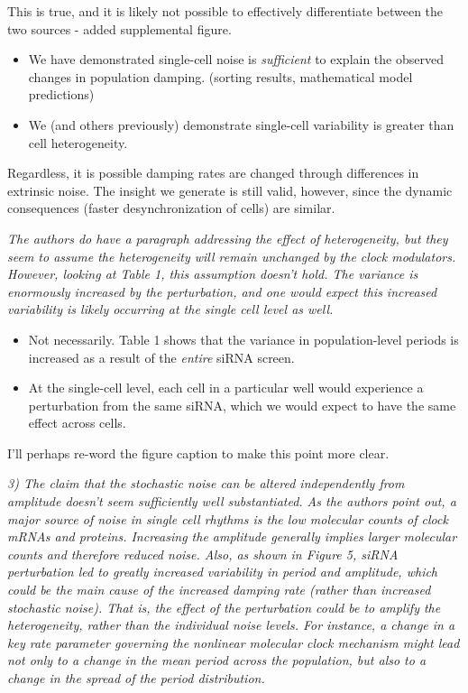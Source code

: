 \documentclass[11pt, letterpaper]{article}
\newenvironment{reviewer}{\itshape\color{gray}}{}
\begin{document}
This is true, and it is likely not possible to effectively differentiate between the two sources - added supplemental figure.
\begin{itemize}
  \item We have demonstrated single-cell noise is {\itshape sufficient} to explain the observed changes in population damping. (sorting results, mathematical model predictions)
  \item We (and others previously) demonstrate single-cell variability is greater than cell heterogeneity.
\end{itemize}
Regardless, it is possible damping rates are changed through differences in extrinsic noise. The insight we generate is still valid, however, since the dynamic consequences (faster desynchronization of cells) are similar.

\begin{reviewer}
The authors do have a paragraph addressing the effect of heterogeneity, but they seem to assume the heterogeneity will remain unchanged by the clock modulators. However, looking at Table 1, this assumption doesn't hold. The variance is enormously increased by the perturbation, and one would expect this increased variability is likely occurring at the single cell level as well.
\end{reviewer}

\begin{itemize}
  \item Not necessarily. Table 1 shows that the variance in population-level periods is increased as a result of the {\itshape entire} siRNA screen.
  \item At the single-cell level, each cell in a particular well would experience a perturbation from the same siRNA, which we would expect to have the same effect across cells.
\end{itemize}
I'll perhaps re-word the figure caption to make this point more clear.

\begin{reviewer}
3) The claim that the stochastic noise can be altered independently from amplitude doesn't seem sufficiently well substantiated. As the authors point out, a major source of noise in single cell rhythms is the low molecular counts of clock mRNAs and proteins. Increasing the amplitude generally implies larger molecular counts and therefore reduced noise. Also, as shown in Figure 5, siRNA perturbation led to greatly increased variability in period and amplitude, which could be the main cause of the increased damping rate (rather than increased stochastic noise). That is, the effect of the perturbation could be to amplify the heterogeneity, rather than the individual noise levels. For instance, a change in a key rate parameter governing the nonlinear molecular clock mechanism might lead not only to a change in the mean period across the population, but also to a change in the spread of the period distribution. 
\end{reviewer}
\end{document}

